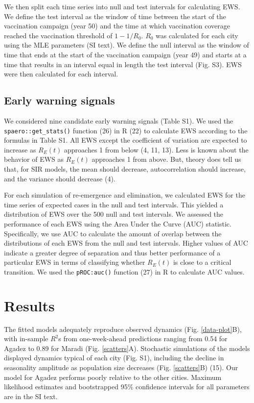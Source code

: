 \documentclass[3p]{elsarticle} %
\begin{document}
We then split each time series into null and test intervals for
calculating EWS. We define the test interval as the window of time
between the start of the vaccination campaign (year 50) and the time at
which vaccination coverage reached the vaccination threshold of
\(1 - 1/R_0\). \(R_0\) was calculated for each city using the MLE
parameters (SI text). We define the null interval as the window of time
that ends at the start of the vaccination campaign (year 49) and starts
at a time that results in an interval equal in length the test interval
(Fig. S3). EWS were then calculated for each interval.

\hypertarget{early-warning-signals}{%
\subsection{Early warning signals}\label{early-warning-signals}}

We considered nine candidate early warning signals (Table S1). We used
the \texttt{spaero::get\_stats()} function (26) in R (22) to calculate
EWS according to the formulas in Table S1. All EWS except the
coefficient of variation are expected to increase as \(R_E(t)\)
approaches 1 from below (4, 11, 13). Less is known about the behavior of
EWS as \(R_E(t)\) approaches 1 from above. But, theory does tell us
that, for SIR models, the mean should decrease, autocorrelation should
increase, and the variance should decrease (4).

For each simulation of re-emergence and elimination, we calculated EWS
for the time series of expected cases in the null and test intervals.
This yielded a distribution of EWS over the 500 null and test intervals.
We assessed the performance of each EWS using the Area Under the Curve
(AUC) statistic. Specifically, we use AUC to calculate the amount of
overlap between the distributions of each EWS from the null and test
intervals. Higher values of AUC indicate a greater degree of separation
and thus better performance of a particular EWS in terms of classifying
whether \(R_E(t)\) is close to a critical transition. We used the
\texttt{pROC:auc()} function (27) in R to calculate AUC values.

\hypertarget{results}{%
\section{Results}\label{results}}

The fitted models adequately reproduce observed dynamics (Fig.
\ref{data-plot}B), with in-sample \(R^2\)s from one-week-ahead
predictions ranging from 0.54 for Agadez to 0.89 for Maradi (Fig.
\ref{scatters}A). Stochastic simulations of the models displayed
dynamics typical of each city (Fig. S1), including the decline in
seasonality amplitude as population size decreases (Fig.
\ref{scatters}B) (15). Our model for Agadez performs poorly relative to
the other cities. Maximum likelihood estimates and bootstrapped 95\%
confidence intervals for all parameters are in the SI text.
\end{document}

